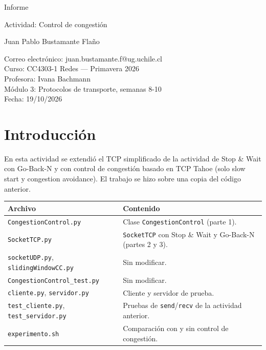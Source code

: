 \documentclass[11pt,letterpaper]{article}
\newcommand{\curso}{CC4303-1 Redes}
\newcommand{\tituloinforme}{Actividad: Control de congestión}
\begin{document}
\begin{titlepage}
  \thispagestyle{portada}
  \centering
  \vspace*{5cm}
  {\LARGE Informe\par}
  \vspace{0.3cm}
  {\Large \tituloinforme\par}
  \vspace{0.4cm}
  {\large Juan Pablo Bustamante Flaño\par}
  \vfill
  Correo electrónico: juan.bustamante.f@ug.uchile.cl\\
  Curso: \curso{} --- Primavera 2026\\
  Profesora: Ivana Bachmann\\
  Módulo 3: Protocolos de transporte, semanas 8-10\\
  Fecha: 19/10/2026
  \vspace*{3cm}
\end{titlepage}

\section{Introducción}

En esta actividad se extendió el TCP simplificado de la actividad de Stop \& Wait con
Go-Back-N y con control de congestión basado en TCP Tahoe (solo slow start y congestion
avoidance). El trabajo se hizo sobre una copia del código anterior.

\begin{center}
\begin{tabular}{@{}ll@{}}
  \toprule
  Archivo & Contenido \\
  \midrule
  \texttt{CongestionControl.py} & Clase \texttt{CongestionControl} (parte 1). \\
  \texttt{SocketTCP.py} & \texttt{SocketTCP} con Stop \& Wait y Go-Back-N (partes 2 y 3). \\
  \texttt{socketUDP.py}, \texttt{slidingWindowCC.py} & Sin modificar. \\
  \texttt{CongestionControl\_test.py} & Sin modificar. \\
  \texttt{cliente.py}, \texttt{servidor.py} & Cliente y servidor de prueba. \\
  \texttt{test\_cliente.py}, \texttt{test\_servidor.py} & Pruebas de \texttt{send}/\texttt{recv} de la actividad anterior. \\
  \texttt{experimento.sh} & Comparación con y sin control de congestión. \\
  \bottomrule
\end{tabular}
\end{center}
\end{document}
